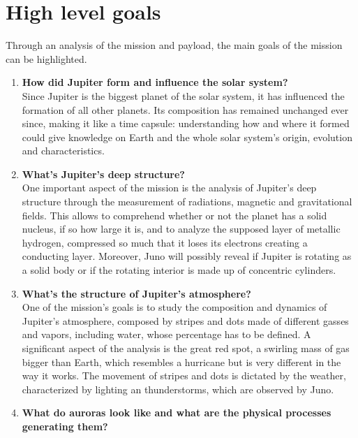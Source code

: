 \section{High level goals}
\label{sec:goals}

Through an analysis of the mission and payload, the main goals of the mission can be highlighted. 

\begin{enumerate}
    \item \textbf{How did Jupiter form and influence the solar system? } \cite{2006_overview} \cite{video_1h}\\ %
    Since Jupiter is the biggest planet of the solar system, it has influenced the formation of all other planets. Its composition has remained unchanged ever since, making it like a time capsule: understanding how and where it formed could give knowledge on Earth and the whole solar system’s origin, evolution and characteristics. 
    \item \textbf{What's Jupiter's deep structure?} \cite {Overview_Juno} \cite{video_1h} \\
    One important aspect of the mission is the analysis of Jupiter's deep structure through the measurement of radiations, magnetic and gravitational fields. This allows to comprehend whether or not the planet has a solid nucleus, if so how large it is, and to analyze the supposed layer of metallic hydrogen, compressed so much that it loses its electrons creating a conducting layer.  Moreover, Juno will possibly reveal if Jupiter is rotating as a solid body or if the rotating interior is made up of concentric cylinders. %
    \item \textbf{What's the structure of Jupiter's atmosphere?}  \cite{Juno_mission}\cite{video_1h} \\ %
    One of the mission's goals is to study the composition and dynamics of Jupiter's atmosphere, composed by stripes and dots made of different gasses and vapors, including water, whose percentage has to be defined. A significant aspect of the analysis is the great red spot, a swirling mass of gas bigger than Earth, which resembles a hurricane but is very different in the way it works. The movement of stripes and dots is dictated by the weather, characterized by lighting an thunderstorms, which are observed by Juno. 
    \item \textbf{What do auroras look like and what are the physical processes generating them?}  \cite{Juno_mission} \cite{video_1h}\\ %

\end{enumerate}
